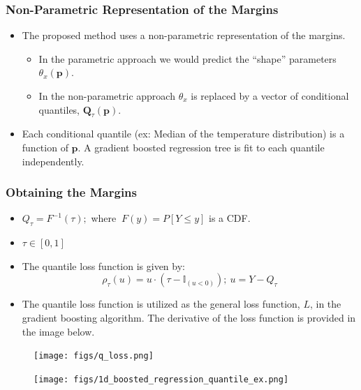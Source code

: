 \documentclass[t, pdftex]{beamer}
\begin{document}
\begin{frame}
\frametitle{Non-Parametric Representation of the Margins}
\begin{itemize}
\item The proposed method uses a non-parametric representation of the margins.
\begin{itemize}
	\item In the parametric approach we would predict the ``shape'' parameters $\theta_{x}(\mathbf{p})$.
	\item In the non-parametric approach $\theta_x$ is replaced by a vector of conditional quantiles, $\mathbf Q_\tau (\mathbf p)$.
\end{itemize}
\item  Each conditional quantile (ex: Median of the temperature distribution) is a function of $\mathbf p$. A gradient boosted regression tree is fit to each quantile independently.
\end{itemize}
\end{frame}

\begin{frame}[shrink=20]
\frametitle{Obtaining the Margins}
\begin{itemize}
\item $Q_\tau = F^{-1}(\tau); $ where $\ F(y)=P[Y \leq y]$ is a CDF.
\item $\tau \in [0, 1]$

\item The quantile loss function is given by:
\[
\rho_\tau(u) = u \cdot (\tau - \mathbb{I}_{(u < 0)});\ u=Y - Q_\tau
\]
\item The quantile loss function is utilized as the general loss function, $L$, in the gradient boosting algorithm.  The derivative of the loss function is provided in the image below.
\end{itemize}
\begin{figure}
        \centering
        \begin{minipage}{.5\textwidth}
            \centering
            \texttt{[image: figs/q\_loss.png]}
        \end{minipage}%
        \begin{minipage}{.5\textwidth}
            \centering
            \texttt{[image: figs/1d\_boosted\_regression\_quantile\_ex.png]}
        \end{minipage}
\end{figure}
\end{frame}
\end{document}
